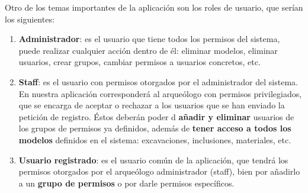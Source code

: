 Otro de los temas importantes de la aplicación son los roles de usuario, que serían los
siguientes:

    \begin{enumerate}
        \item \textbf{Administrador}: es el usuario que tiene todos los permisos del
        sistema, puede realizar cualquier acción dentro de él: eliminar modelos, eliminar
        usuarios, crear grupos, cambiar permisos a usuarios concretos, etc.
        \item \textbf{Staff}: es el usuario con permisos otorgados por el administrador
        del sistema. En nuestra aplicación corresponderá al arqueólogo con permisos
        privilegiados, que se encarga de aceptar o rechazar a los usuarios que se han
        enviado la petición de registro. Éstos deberán poder d \textbf{añadir y eliminar}
        usuarios de los grupos de permisos ya definidos, además de \textbf{tener acceso a
        todos los modelos} definidos en el sistema: excavaciones, inclusiones, materiales, etc.
        \item \textbf{Usuario registrado}: es el usuario común de la aplicación, que tendrá
        los permisos otorgados por el arqueólogo administrador (staff), bien por añadirlo
        a un \textbf{grupo de permisos} o por darle permisos específicos.
    \end{enumerate}
